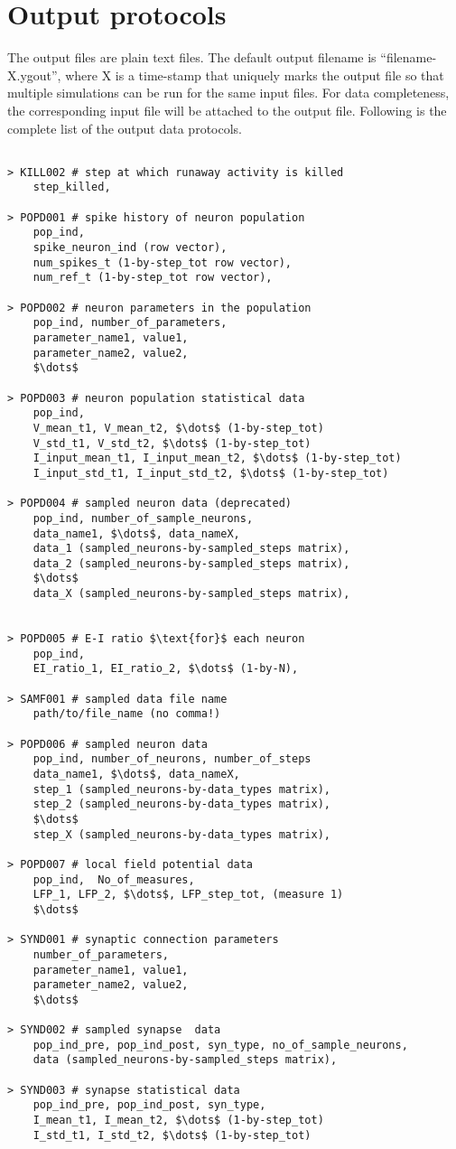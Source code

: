 \documentclass{article}
\begin{document}
\section{Output protocols}
\label{sec:Output protocols}
The output files are plain text files.
The default output filename is ``filename-X.ygout'', where X is a time-stamp that uniquely marks the output file so that multiple simulations can be run for the same input files.
For data completeness, the corresponding input file will be attached to the output file.
Following is the complete list of the output data protocols.
\begin{lstlisting}[mathescape]

> KILL002 # step at which runaway activity is killed
	step_killed,

> POPD001 # spike history of neuron population
	pop_ind,
	spike_neuron_ind (row vector),
	num_spikes_t (1-by-step_tot row vector),
	num_ref_t (1-by-step_tot row vector),

> POPD002 # neuron parameters in the population
	pop_ind, number_of_parameters,
	parameter_name1, value1,
	parameter_name2, value2,
	$\dots$

> POPD003 # neuron population statistical data
	pop_ind,
	V_mean_t1, V_mean_t2, $\dots$ (1-by-step_tot)
	V_std_t1, V_std_t2, $\dots$ (1-by-step_tot)
	I_input_mean_t1, I_input_mean_t2, $\dots$ (1-by-step_tot)
	I_input_std_t1, I_input_std_t2, $\dots$ (1-by-step_tot)
	
> POPD004 # sampled neuron data (deprecated)
	pop_ind, number_of_sample_neurons,
	data_name1, $\dots$, data_nameX,
	data_1 (sampled_neurons-by-sampled_steps matrix),
	data_2 (sampled_neurons-by-sampled_steps matrix),
	$\dots$
	data_X (sampled_neurons-by-sampled_steps matrix),


> POPD005 # E-I ratio $\text{for}$ each neuron
	pop_ind,
	EI_ratio_1, EI_ratio_2, $\dots$ (1-by-N),
	
> SAMF001 # sampled data file name
	path/to/file_name (no comma!)

> POPD006 # sampled neuron data
	pop_ind, number_of_neurons, number_of_steps
	data_name1, $\dots$, data_nameX,
	step_1 (sampled_neurons-by-data_types matrix),
	step_2 (sampled_neurons-by-data_types matrix),
	$\dots$
	step_X (sampled_neurons-by-data_types matrix),
	
> POPD007 # local field potential data
	pop_ind,  No_of_measures, 
	LFP_1, LFP_2, $\dots$, LFP_step_tot, (measure 1)
	$\dots$ 
	
> SYND001 # synaptic connection parameters
	number_of_parameters,
	parameter_name1, value1,
	parameter_name2, value2,
	$\dots$

> SYND002 # sampled synapse  data
	pop_ind_pre, pop_ind_post, syn_type, no_of_sample_neurons,
	data (sampled_neurons-by-sampled_steps matrix),

> SYND003 # synapse statistical data
	pop_ind_pre, pop_ind_post, syn_type,
	I_mean_t1, I_mean_t2, $\dots$ (1-by-step_tot)
	I_std_t1, I_std_t2, $\dots$ (1-by-step_tot)
	
	

\end{lstlisting}


{}

\end{document}
